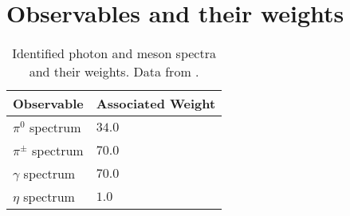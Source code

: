 \documentclass[aps,preprint,floatfix,nofootinbib,showpacs]{revtex4-1}
\begin{document}
\section{Observables and their weights}
 \begin{table}[!h]
  \begin{center}
   \begin{tabular}{l|l}
    \hline 
    \hline
    Observable  \hspace{3cm} &  \hspace{1cm} Associated Weight \\ \hline
    $\pi^0$ spectrum         & \hspace{3cm} $34.0$ \\ \hline
    $\pi^\pm$ spectrum       & \hspace{3cm} $70.0$ \\ \hline
    $\gamma$ spectrum        & \hspace{3cm} $70.0$ \\ \hline
    $\eta$ spectrum          & \hspace{3cm} $1.0$ \\ \hline \hline
   \end{tabular}
  \end{center}
  \caption{Identified photon and meson spectra and their weights. Data from
  \cite{Buskulic:1994ft, Barate:1996fi, Heister:2001kp, Adriani:1992hd, Akers:1994ez, Ackerstaff:1998ap, Abe:1998zs}.}
  \label{Tab1}
 \end{table}
 
\end{document}
